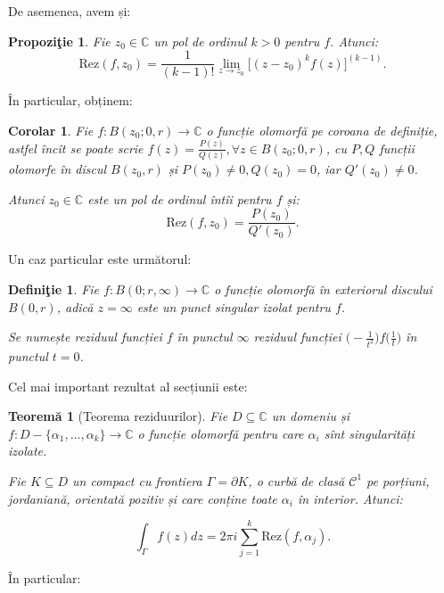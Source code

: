 \documentclass[12pt,a4paper]{article}
\newcommand\kal{\mathcal}
\newcommand\seq{\subseteq}
\newcommand\CC{\mathbb{C}}
\theoremstyle{dotless}
\newtheorem{theorem}{Teorem\u{a}}
\newtheorem{proposition}{Propozi\c{t}ie}
\newtheorem{corollary}{Corolar}
\theoremstyle{dotlessdr}
\newtheorem{definition}{Defini\c{t}ie}
\begin{document}
De asemenea, avem și:

\begin{proposition}\label{pr:rez-mult}
  Fie $ z_0 \in \CC $ un pol de ordinul $ k > 0 $ pentru $ f $. Atunci:
  \[
    \mathrm{Rez}(f, z_0) = \frac{1}{(k - 1)!}\lim_{z \to z_0} %
    \big[ (z - z_0)^k f(z) \big]^{(k - 1)}.
  \]
\end{proposition}

În particular, obținem:

\begin{corollary}\label{cor:rez-mult}
  Fie $ f : B(z_0; 0, r) \to \CC $ o funcție olomorfă pe coroana de definiție, astfel
  încît se poate scrie $ f(z) = \frac{P(z)}{Q(z)}, \forall z \in B(z_0; 0, r) $, cu
  $ P, Q $ funcții olomorfe în discul $ B(z_0, r) $ și $ P(z_0) \neq 0, Q(z_0) = 0 $,
  iar $ Q'(z_0) \neq 0 $.

  Atunci $ z_0 \in \CC $ este un pol de ordinul întîi pentru $ f $ și:
  \[
    \mathrm{Rez}(f, z_0) = \frac{P(z_0)}{Q'(z_0)}.
  \]
\end{corollary}

Un caz particular este următorul:

\begin{definition}\label{def:rez-inf}
  Fie $ f : B(0; r, \infty) \to \CC $ o funcție olomorfă în exteriorul discului
  $ B(0, r) $, adică $ z = \infty $ este un punct singular izolat pentru $ f $.

  Se numește \emph{reziduul funcției $ f $ în punctul $ \infty $} reziduul funcției
  $ \big( -\frac{1}{t^2} \big) f\big(\frac{1}{t}\big) $ în punctul $ t = 0 $.
\end{definition}

Cel mai important rezultat al secțiunii este:

\begin{theorem}[Teorema reziduurilor]\label{thm:thm-rez}
  Fie $ D \seq \CC $ un domeniu și $ f : D - \{ \alpha_1, \dots, \alpha_k \} \to \CC $
  o funcție olomorfă pentru care $ \alpha_i $ sînt singularități izolate.

  Fie $ K \seq D $ un compact cu frontiera $ \Gamma = \partial K $, o curbă de clasă
  $ \kal{C}^1 $ pe porțiuni, jordaniană, orientată pozitiv și care conține toate $ \alpha_i $
  în interior. Atunci:

  \[
    \int_\Gamma f(z) dz = 2\pi i \sum_{j = 1}^k \mathrm{Rez}(f, \alpha_j).
  \]
\end{theorem}

În particular:
\end{document}
